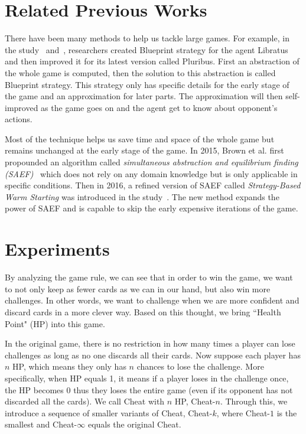 \documentclass[runningheads]{llncs}
\begin{document}
\section{Related Previous Works}
    There have been many methods to help us tackle large games. For example, in the study~\cite{brown2018superhuman} and~\cite{brown2019superhuman}, researchers created Blueprint strategy for the agent Libratus and then improved it for its latest version called Pluribus. First an abstraction of the whole game is computed, then the solution to this abstraction is called Blueprint strategy. This strategy only has specific details for the early stage of the game and an approximation for later parts. The approximation will then self-improved as the game goes on and the agent get to know about opponent's actions.

    Most of the technique helps us save time and space of the whole game but remains unchanged at the early stage of the game. In 2015, Brown et al. first propounded an algorithm called \textit{simultaneous abstraction and equilibrium finding (SAEF)}~\cite{brown2015simultaneous} which does not rely on any domain knowledge but is only applicable in specific conditions. Then in 2016, a refined version of SAEF called \textit{Strategy-Based Warm Starting} was introduced in the study~\cite{brown2016strategy}. The new method expands the power of SAEF and is capable to skip the early expensive iterations of the game.

\section{Experiments}

    By analyzing the game rule, we can see that in order to win the game, we want to not only keep as fewer cards as we can in our hand, but also win more challenges. In other words, we want to challenge when we are more confident and discard cards in a more clever way. Based on this thought, we bring ``Health Point" (HP) into this game.
    
    In the original game, there is no restriction in how many times a player can lose challenges as long as no one discards all their cards. Now suppose each player has $n$ HP, which means they only has $n$ chances to lose the challenge. More specifically, when HP equals 1, it means if a player loses in the challenge once, the HP becomes 0 thus they loses the entire game (even if its opponent has not discarded all the cards).  We call Cheat with $n$ HP, Cheat-$n$. Through this, we introduce a sequence of smaller variants of Cheat, Cheat-$k$, where Cheat-$1$ is the smallest and Cheat-$\infty$ equals the original Cheat.
    
\end{document}
